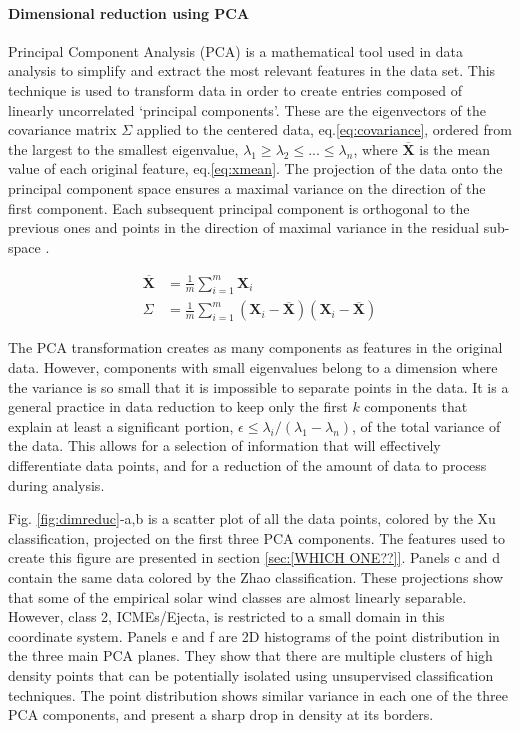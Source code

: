 \paragraph{Dimensional reduction using PCA}
Principal Component Analysis (PCA) is a mathematical tool used in data analysis to simplify and extract the most relevant features in the data set. This technique is used to transform data in order to create entries composed of linearly uncorrelated `principal components'. These are the eigenvectors of the covariance matrix $\Sigma$ applied to the centered data, eq.\eqref{eq:covariance}, ordered from the largest to the smallest eigenvalue, $\lambda_1 \ge \lambda_2 \le ... \le \lambda_n$, where $\overline{\boldsymbol{X}}$ is the mean value of each original feature, eq.\eqref{eq:xmean}. The projection of the data onto the principal component space ensures a maximal variance on the direction of the first component. Each subsequent principal component is orthogonal to the previous ones and points in the direction of maximal variance in the residual sub-space \citep{Shlens2014}.

\begin{align}
\overline{\boldsymbol{X}} & = \frac{1}{m} \sum_{i=1}^{m} \boldsymbol{X}_i \label{eq:xmean} \\
\Sigma & = \frac{1}{m} \sum_{i=1}^{m} \left( \boldsymbol{X}_i - \overline{\boldsymbol{X}} \right)\left( \boldsymbol{X}_i - \overline{\boldsymbol{X}} \right) \label{eq:covariance}
\end{align}

The PCA transformation creates as many components as features in the original data. However, components with small eigenvalues belong to a dimension where the variance is so small that it is impossible to separate points in the data. It is a general practice in data reduction to keep only the first $k$ components that explain at least a significant portion, $\epsilon \le \lambda_i/(\lambda_1 - \lambda_n)$, of the total variance of the data. This allows for a selection of information that will effectively differentiate data points, and for a reduction of the amount of data to process during analysis.

Fig. \ref{fig:dimreduc}-a,b is a scatter plot of all the data points, colored by the Xu classification, projected on the first three PCA components. The features used to create this figure are presented in section \ref{sec:[WHICH ONE??]}. Panels c and d contain the same data colored by the Zhao classification. These projections show that some of the empirical solar wind classes are almost linearly separable. However, class 2, ICMEs/Ejecta, is restricted to a small domain in this coordinate system. Panels e and f are 2D histograms of the point distribution in the three main PCA planes. They show that there are multiple clusters of high density points that can be potentially isolated using unsupervised classification techniques. The point distribution shows similar variance in each one of the three PCA components, and present a sharp drop in density at its borders.

